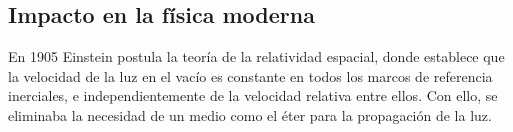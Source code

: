 \documentclass[a4paper, 12pt]{article}
\begin{document}
		\subsection{Impacto en la física moderna}
		\indent En 1905 Einstein postula la teoría de la relatividad espacial, donde establece que la velocidad de la luz en el vacío es constante en todos los marcos de referencia inerciales, e independientemente de la velocidad relativa entre ellos. \newline
		\indent Con ello, se eliminaba la necesidad de un medio como el éter para la propagación de la luz.
\end{document}
